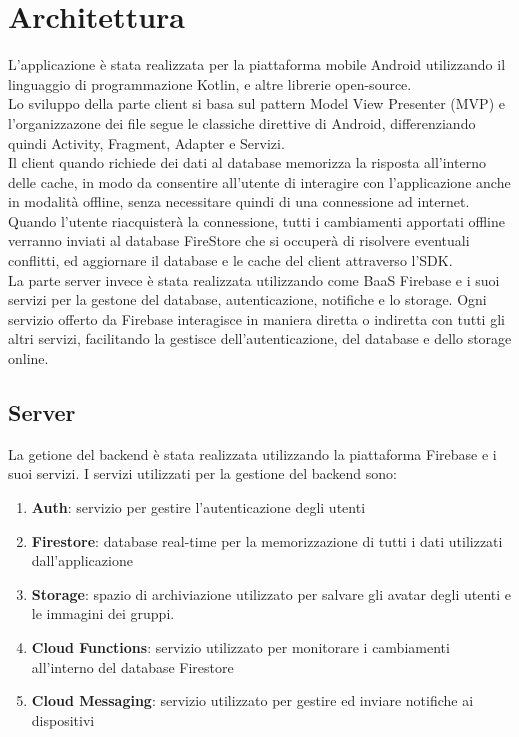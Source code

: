 
\chapter{Architettura}                %
\lhead[\fancyplain{}{\bfseries\thepage}]{\fancyplain{}{\bfseries\rightmark}}


L'applicazione è stata realizzata per la piattaforma mobile Android utilizzando il linguaggio di programmazione Kotlin, e altre librerie open-source.\\
Lo sviluppo della parte client si basa sul pattern Model View Presenter (MVP) e l'organizzazone dei file segue le classiche direttive di Android, differenziando quindi Activity, Fragment, Adapter e Servizi.\\
Il client quando richiede dei dati al database memorizza la risposta all'interno delle cache, in modo da consentire all'utente di interagire con l'applicazione anche in modalità offline, senza necessitare quindi di una connessione ad internet. Quando l'utente riacquisterà la connessione, tutti i cambiamenti apportati offline verranno inviati al database FireStore che si occuperà di risolvere eventuali conflitti, ed aggiornare il database e le cache del client attraverso l'SDK.\\
La parte server invece è stata realizzata utilizzando come BaaS Firebase e i suoi servizi per la gestone del database, autenticazione, notifiche e lo storage. Ogni servizio offerto da Firebase interagisce in maniera diretta o indiretta con tutti gli altri servizi, facilitando la gestisce dell'autenticazione, del database e dello storage online.\\


\newpage



\section{Server}                 %
La getione del backend è stata realizzata utilizzando la piattaforma Firebase e i suoi servizi.
I servizi utilizzati per la gestione del backend sono:
\begin{enumerate}
\item \textbf{Auth}: servizio per gestire l'autenticazione degli utenti
\item \textbf{Firestore}: database real-time per la memorizzazione di tutti i dati utilizzati dall'applicazione
\item \textbf{Storage}: spazio di archiviazione utilizzato per salvare gli avatar degli utenti e le immagini dei gruppi.
\item \textbf{Cloud Functions}: servizio utilizzato per monitorare i cambiamenti all'interno del database Firestore
\item \textbf{Cloud Messaging}: servizio utilizzato per gestire ed inviare notifiche ai dispositivi
\end{enumerate}



